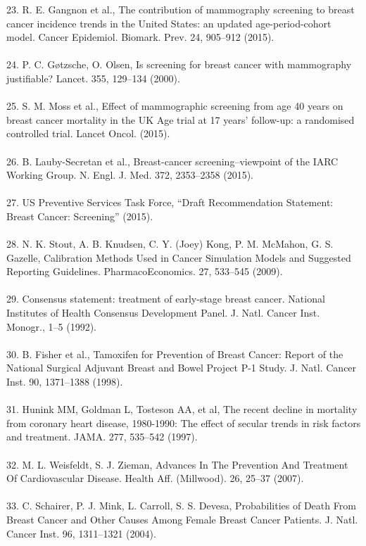 \documentclass[11pt,letterpaper]{article}
\theoremstyle{plain}
\theoremstyle{remark}
\numberwithin{equation}{section}
\begin{document}
23. 	R. E. Gangnon et al., The contribution of mammography screening to breast cancer incidence trends in the United States: an updated age-period-cohort model. Cancer Epidemiol. Biomark. Prev. 24, 905–912 (2015). \\\\
24. 	P. C. Gøtzsche, O. Olsen, Is screening for breast cancer with mammography justifiable? Lancet. 355, 129–134 (2000). \\\\
25. 	S. M. Moss et al., Effect of mammographic screening from age 40 years on breast cancer mortality in the UK Age trial at 17 years’ follow-up: a randomised controlled trial. Lancet Oncol. (2015).\\\\
26. 	B. Lauby-Secretan et al., Breast-cancer screening--viewpoint of the IARC Working Group. N. Engl. J. Med. 372, 2353–2358 (2015). \\\\
27. 	US Preventive Services Task Force, “Draft Recommendation Statement: Breast Cancer: Screening” (2015).\\\\
28. 	N. K. Stout, A. B. Knudsen, C. Y. (Joey) Kong, P. M. McMahon, G. S. Gazelle, Calibration Methods Used in Cancer Simulation Models and Suggested Reporting Guidelines. PharmacoEconomics. 27, 533–545 (2009). \\\\
29. 	Consensus statement: treatment of early-stage breast cancer. National Institutes of Health Consensus Development Panel. J. Natl. Cancer Inst. Monogr., 1–5 (1992). \\\\
30. 	B. Fisher et al., Tamoxifen for Prevention of Breast Cancer: Report of the National Surgical Adjuvant Breast and Bowel Project P-1 Study. J. Natl. Cancer Inst. 90, 1371–1388 (1998). \\\\
31. 	Hunink MM, Goldman L, Tosteson AA, et al, The recent decline in mortality from coronary heart disease, 1980-1990: The effect of secular trends in risk factors and treatment. JAMA. 277, 535–542 (1997). \\\\
32. 	M. L. Weisfeldt, S. J. Zieman, Advances In The Prevention And Treatment Of Cardiovascular Disease. Health Aff. (Millwood). 26, 25–37 (2007). \\\\
33. 	C. Schairer, P. J. Mink, L. Carroll, S. S. Devesa, Probabilities of Death From Breast Cancer and Other Causes Among Female Breast Cancer Patients. J. Natl. Cancer Inst. 96, 1311–1321 (2004). \\\\
\end{document}
